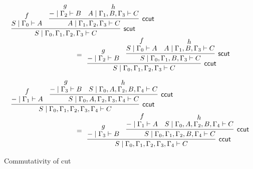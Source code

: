 \documentclass[sn-mathphys-num]{sn-jnl}%
\newcommand{\GG}{\Gamma}
\newcommand{\vd}{\vdash}
\newcommand{\mf}[1]{\mathsf{#1}}
\theoremstyle{thmstyleone}%
\theoremstyle{thmstyletwo}%
\theoremstyle{thmstylethree}%
\begin{document}
\begin{figure}
  \begin{displaymath}
    \begin{array}{l}
      \begin{array}{c}
        \infer[\mf{scut}]{S \mid \GG_0, \GG_1 , \GG_2 , \GG_3 \vd C}{
        \deduce{S \mid \GG_0 \vd A}{f}
        &
        \infer[\mf{ccut}]{A \mid \GG_1 , \GG_2 , \GG_3 \vd C}{
        \deduce{{-} \mid \GG_2 \vd B}{g}
        &
        \deduce{A \mid \GG_1 , B , \GG_3 \vd C}{h}
        }
        }
      \end{array}
      \\[10pt]
      \qquad \qquad \qquad \qquad \qquad  =
      \begin{array}{c}
        \infer[\mf{ccut}]{S \mid \GG_0, \GG_1 , \GG_2 , \GG_3 \vd C}{
        \deduce{{-} \mid \GG_2 \vd B}{g}
        &
        \infer[\mf{scut}]{S \mid \GG_0 , \GG_1 , B , \GG_3 \vd C}{
        \deduce{S \mid \GG_0 \vd A}{f}
        &
        \deduce{A \mid \GG_1 , B , \GG_3 \vd C}{h}
        }
        }
      \end{array}
      \\[30pt]
      \begin{array}{c}
        \infer[\mf{ccut}]{S \mid \GG_0 , \GG_1 , \GG_2 , \GG_3 , \GG_4 \vd C}{
        \deduce{{-} \mid \GG_1 \vd A}{f}
        &
        \infer[\mf{ccut}]{S \mid \GG_0 , A , \GG_2 , \GG_3 , \GG_4 \vd C}{
        \deduce{{-} \mid \GG_3 \vd B}{g}
        &
        \deduce{S \mid \GG_0 , A , \GG_2 , B , \GG_4 \vd C}{h}
        }
        }
      \end{array}
      \\[10pt]
      \qquad \qquad \qquad \qquad \qquad  =
      \begin{array}{c}
        \infer[\mf{ccut}]{S \mid \GG_0 , \GG_1 , \GG_2 , \GG_3 , \GG_4 \vd C}{
        \deduce{{-} \mid \GG_3 \vd B}{g}
        &
        \infer[\mf{ccut}]{S \mid \GG_0 , \GG_1 , \GG_2 , B , \GG_4 \vd C}{
        \deduce{{-} \mid \GG_1 \vd A}{f}
        &
        \deduce{S \mid \GG_0 , A , \GG_2 , B , \GG_4 \vd C}{h}
        }
        }
      \end{array}
    \end{array}
  \end{displaymath}
  \caption{Commutativity of cut}
  \label{fig:commcut}
\end{figure}
\end{document}
